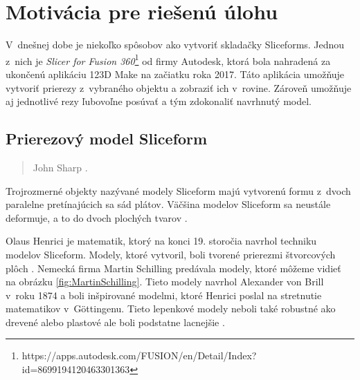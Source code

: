 \chapter{Motivácia pre riešenú úlohu}

V~dnešnej dobe je niekoľko spôsobov ako vytvoriť skladačky Sliceforms. Jednou z~nich je \textit{Slicer for Fusion 360}\footnote{https://apps.autodesk.com/FUSION/en/Detail/Index?id=8699194120463301363} od firmy Autodesk, ktorá bola nahradená za ukončenú aplikáciu 123D Make na začiatku roka 2017. Táto aplikácia umožňuje vytvoriť prierezy z~vybraného objektu a zobraziť ich v~rovine. Zároveň umožňuje aj jednotlivé rezy ľubovoľne posúvať a tým zdokonaliť navrhnutý model.
\section{Prierezový model Sliceform}

\begin{quotation} \textit{
 }John Sharp \cite{sharp1995sliceforms}.
\end{quotation}




Trojrozmerné objekty nazývané modely Sliceform majú vytvorenú formu z~dvoch paralelne pretínajúcich sa sád plátov. Väčšina modelov Sliceform sa neustále deformuje, a to do dvoch plochých tvarov \cite{sharp1995sliceforms}.





Olaus Henrici je matematik, ktorý na konci 19. storočia navrhol techniku modelov Sliceform. Modely, ktoré vytvoril, boli tvorené prierezmi štvorcových plôch \cite{johnsharp2010assemble}.
Nemecká firma Martin Schilling predávala modely, ktoré môžeme vidieť na obrázku \ref{fig:MartinSchilling}. Tieto modely navrhol Alexander von Brill v~roku 1874 a boli inšpirované modelmi, ktoré Henrici poslal na stretnutie matematikov v~Göttingenu. Tieto lepenkové modely neboli také robustné ako drevené alebo plastové ale boli podstatne lacnejšie \cite{brill}.

